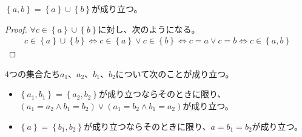 \documentclass[a4paper]{jsarticle}
\begin{document}
\begin{thm}
\label{1.2.1.6}
$\left\{ a,b \right\} = \left\{ a \right\} \cup \left\{ b \right\}$が成り立つ。
\end{thm}
\begin{proof}
$\forall c \in \left\{ a \right\} \cup \left\{ b \right\}$に対し、次のようになる。
\begin{align*}
c \in \left\{ a \right\} \cup \left\{ b \right\} \Leftrightarrow c \in \left\{ a \right\} \vee c \in \left\{ b \right\} \Leftrightarrow c = a \vee c = b \Leftrightarrow c \in \left\{ a,b \right\}
\end{align*}
\end{proof}
\begin{thm}
\label{1.2.1.7}
4つの集合たち$a_{1}$、$a_{2}$、$b_{1}$、$b_{2}$について次のことが成り立つ。
\begin{itemize}
\item
  $\left\{ a_{1},b_{1} \right\} = \left\{ a_{2},b_{2} \right\}$が成り立つならそのときに限り、$\left( a_{1} = a_{2} \land b_{1} = b_{2} \right) \vee \left( a_{1} = b_{2} \land b_{1} = a_{2} \right)$が成り立つ。
\item
  $\left\{ a \right\} = \left\{ b_{1},b_{2} \right\}$が成り立つならそのときに限り、$a = b_{1} = b_{2}$が成り立つ。
\end{itemize}
\end{thm}
\end{document}
